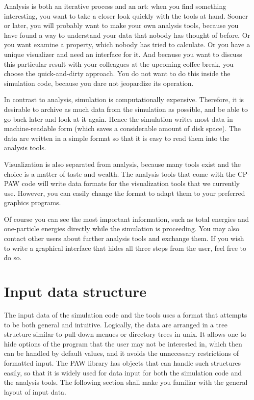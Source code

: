 \documentclass[final,12pt,makeidx,DIV=calc]{article}
\begin{document}
Analysis is both an iterative process and an art: when you find
something interesting, you want to take a closer look quickly with the
tools at hand. Sooner or later, you will probably want to make your
own analysis tools, because you have found a way to understand your
data that nobody has thought of before. Or you want examine a
property, which nobody has tried to calculate. Or you have a unique
visualizer and need an interface for it.  And because you want to
discuss this particular result with your colleagues at the upcoming
coffee break, you choose the quick-and-dirty approach.  You do not
want to do this inside the simulation code, because you dare not
jeopardize its operation.

In contrast to analysis, simulation is computationally expensive.
Therefore, it is desirable to archive as much data from the simulation
as possible, and be able to go back later and look at it again. Hence
the simulation writes most data in machine-readable form (which saves
a considerable amount of disk space).  The data are written in a
simple format so that it is easy to read them into the analysis tools.

Visualization is also separated from analysis, because many tools
exist and the choice is a matter of taste and wealth. The analysis
tools that come with the CP-PAW code will write data formats for the
visualization tools that we currently use.  However, you can easily
change the format to adapt them to your preferred graphics programs.

Of course you can see the most important information, such as total
energies and one-particle energies directly while the simulation is
proceeding. You may also contact other users about further analysis
tools and exchange them. If you wish to write a graphical interface
that hides all three steps from the user, feel free to do so.


\section{Input data structure}
%
The input data of the simulation code and the tools uses a format
that attempts to be both general and intuitive. Logically, the data
are arranged in a tree structure similar to pull-down menues or
directory trees in unix. It allows one to hide options of the program that
the user may not be interested in, which then can be handled by
default values, and it avoids the unnecessary restrictions of formatted
input. The PAW library has objects that can handle such structures
easily, so that it is widely used for data input for both the
simulation code and the analysis tools. The following section shall
make you familiar with the general layout of input data.
%
\end{document}
